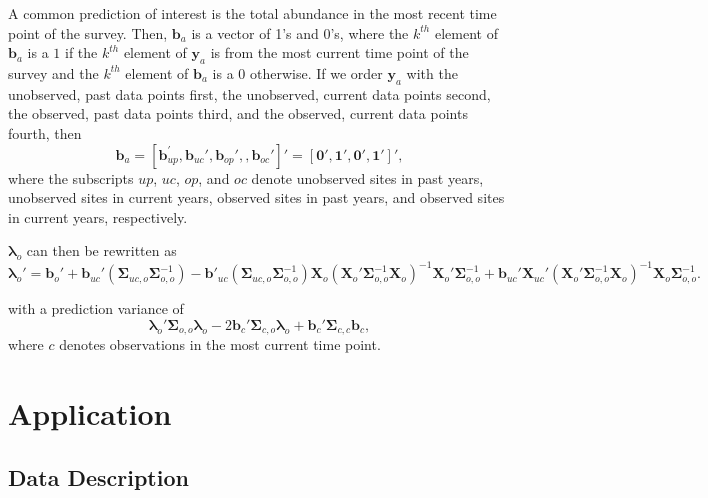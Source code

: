 \documentclass[]{interact}
\theoremstyle{plain}%
\theoremstyle{definition}
\theoremstyle{remark}
\begin{document}
A common prediction of interest is the total abundance in the most
recent time point of the survey. Then, \(\mathbf{b}_a\) is a vector of
1's and 0's, where the \(k^{th}\) element of \(\mathbf{b}_a\) is a \(1\)
if the \(k^{th}\) element of \(\mathbf{y}_a\) is from the most current
time point of the survey and the \(k^{th}\) element of \(\mathbf{b}_a\)
is a 0 otherwise. If we order \(\mathbf{y}_a\) with the unobserved, past
data points first, the unobserved, current data points second, the
observed, past data points third, and the observed, current data points
fourth, then \mbox{} \begin{equation}
\mathbf{b}_a = [\mathbf{b}_{up}^\prime, \mathbf{b}_{uc}', \mathbf{b}_{op}', , \mathbf{b}_{oc}']' = [\mathbf{0}', \mathbf{1}', \mathbf{0}', \mathbf{1}']',
\end{equation} \noindent where the subscripts \(up\), \(uc\), \(op\),
and \(oc\) denote unobserved sites in past years, unobserved sites in
current years, observed sites in past years, and observed sites in
current years, respectively.

\(\bm{\lambda}_o\) can then be rewritten as \mbox{} \begin{equation} 
\label{equation:lambdacurrentpred}
\bm{\lambda}_o' = \mathbf{b}_{o}' + \mathbf{b}_{uc}' (\bm{\Sigma}_{uc, o}\bm{\Sigma}_{o, o}^{-1}) - \mathbf{b}'_{uc}(\bm{\Sigma}_{uc, o} \bm{\Sigma}_{o, o}^{-1})\mathbf{X}_o(\mathbf{X}_o'\bm{\Sigma}_{o, o}^{-1}\mathbf{X}_o)^{-1}\mathbf{X}_o'\bm{\Sigma}_{o, o}^{-1} + \mathbf{b}_{uc}' \mathbf{X}_{uc}'(\mathbf{X}_o'\bm{\Sigma}_{o, o}^{-1}\mathbf{X}_o)^{-1}\mathbf{X}_o \bm{\Sigma}_{o, o}^{-1}.
\end{equation}

with a prediction variance of \mbox{} \begin{equation}
\label{equation:lambdacurrentvar}
\bm{\lambda}_o'\bm{\Sigma}_{o, o}\bm{\lambda}_o - 2 \mathbf{b}_{c}' \bm{\Sigma}_{c, o} \bm{\lambda}_o + \mathbf{b}_{c}' \bm{\Sigma}_{c, c} \mathbf{b}_{c},
\end{equation} \noindent where \(c\) denotes observations in the most
current time point.

\section{Application} \label{section:Application}

\subsection{Data Description}
\end{document}

